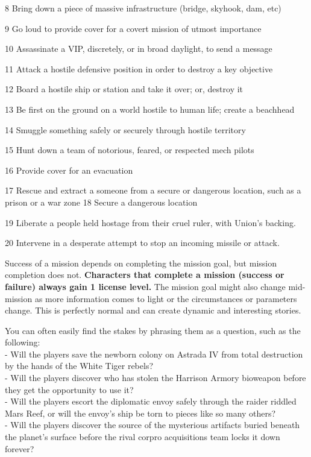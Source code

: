  8         Bring down a piece of massive infrastructure (bridge, skyhook, dam, etc)

 9         Go loud to provide cover for a covert mission of utmost importance

  10       Assassinate a VIP, discretely, or in broad daylight, to send a message

  11       Attack a hostile defensive position in order to destroy a key objective

  12       Board a hostile ship or station and take it over; or, destroy it

  13       Be first on the ground on a world hostile to human life; create a beachhead

  14       Smuggle something safely or securely through hostile territory

  15       Hunt down a team of notorious, feared, or respected mech pilots

  16       Provide cover for an evacuation

  17       Rescue and extract a someone from a secure or dangerous location, such as a prison
           or a war zone
  18       Secure a dangerous location

  19       Liberate a people held hostage from their cruel ruler, with Union’s backing.

  20       Intervene in a desperate attempt to stop an incoming missile or attack.

Success of a mission depends on completing the mission goal, but mission completion does
not. \textbf{Characters that complete a mission (success or failure) always gain 1 license level.} The
mission goal might also change mid-mission as more information comes to light or the
circumstances or parameters change. This is perfectly normal and can create dynamic and
interesting stories.

You can often easily find the stakes by phrasing them as a question, such as the following:\\
-   Will the players save the newborn colony on Astrada IV from total destruction by the hands of the White Tiger rebels?\\
-   Will the players discover who has stolen the Harrison Armory bioweapon before they get the opportunity to use it?\\
-   Will the players escort the diplomatic envoy safely through the raider riddled Mars Reef, or will the envoy’s ship be torn to pieces like so many others?\\
-   Will the players discover the source of the mysterious artifacts buried beneath the planet’s surface before the rival corpro acquisitions team locks it down forever?

